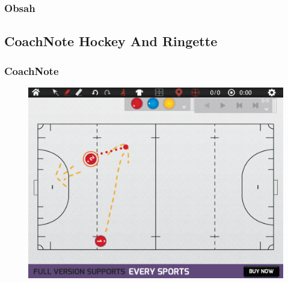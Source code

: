 \documentclass{beamer}
\begin{document}
\begin{frame}
  \frametitle{Obsah}
  \tableofcontents[currentsection]
\end{frame}

\subsection{CoachNote Hockey And Ringette}

\begin{frame}
\frametitle{CoachNote}

  \begin{figure}[H]
    \includegraphics[width=.8\textwidth]{img/IMG_0011}
    \label{pic:coachnote}
  \end{figure}

\end{frame}
\end{document}
